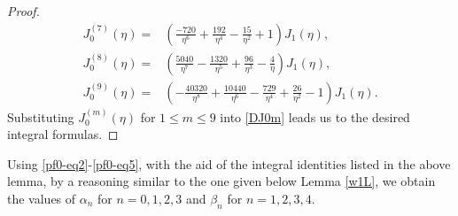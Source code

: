 \documentclass[11pt,a4paper]{article}
\numberwithin{equation}{section}
\begin{document}
{\begin{appendices}
\begin{proof}
\begin{align*}
J_0^{(7)}(\eta)=&\left(\frac{-720}{\eta^6}+\frac{192}{\eta^4}-\frac{15}{\eta^2}+1\right)J_1(\eta),\\
J_0^{(8)}(\eta)=&\left(\frac{5040}{\eta ^7}-\frac{1320}{\eta ^5}+\frac{96}{\eta
   ^3}-\frac{4}{\eta }\right) J_1(\eta ),\\
J_0^{(9)}(\eta)=&\left(-\frac{40320}{\eta ^8}+\frac{10440}{\eta ^6}-\frac{729}{\eta
   ^4}+\frac{26}{\eta ^2}-1\right) J_1(\eta).
\end{align*}
Substituting $J_0^{(m)}(\eta)$ for $1\leq m\leq 9$ into \eqref{DJ0m} leads us to the desired integral formulas.
\end{proof}

Using \eqref{pf0-eq2}-\eqref{pf0-eq5}, with the aid of the integral identities listed in the above lemma, by a reasoning similar to the one given below Lemma \ref{w1L}, we obtain the values of $\alpha_n$  for $n=0,1,2,3$ and $\beta_n$ for $n=1,2,3,4$.

%
%
%
%
%


\end{appendices}}
\end{document}
